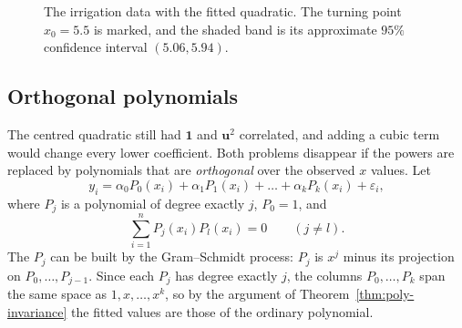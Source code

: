 \documentclass[11pt,a4paper]{article}
\numberwithin{equation}{section}
\theoremstyle{definition}
\begin{document}
\begin{figure}[H]
\centering
{}
\caption{The irrigation data with the fitted quadratic. The turning point $x_0 = 5.5$ is marked, and the shaded
band is its approximate $95\%$ confidence interval $(5.06, 5.94)$.}
\label{fig:irrigation}
\end{figure}

\subsection{Orthogonal polynomials}
The centred quadratic still had $\mathbf{1}$ and $\mathbf{u}^2$ correlated, and adding a cubic term would change every
lower coefficient. Both problems disappear if the powers are replaced by polynomials that are
\emph{orthogonal} over the observed $x$ values. Let
\[
y_i = \alpha_0P_0(x_i) + \alpha_1P_1(x_i) + \dots + \alpha_kP_k(x_i) + \varepsilon_i ,
\]
where $P_j$ is a polynomial of degree exactly $j$, $P_0 = 1$, and
\[
\sum_{i=1}^n P_j(x_i)P_l(x_i) = 0 \qquad (j \ne l) .
\]
The $P_j$ can be built by the Gram--Schmidt process: $P_j$ is $x^j$ minus its projection on $P_0, \dots, P_{j-1}$. Since
each $P_j$ has degree exactly $j$, the columns $P_0, \dots, P_k$ span the same space as $1, x, \dots, x^k$, so by the argument of
Theorem~\ref{thm:poly-invariance} the fitted values are those of the ordinary polynomial.
\end{document}
